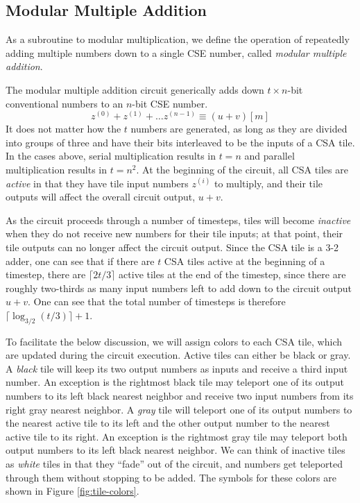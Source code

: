 \subsection{Modular Multiple Addition}
\label{subsec:mma}

As a subroutine to modular multiplication, we define the operation of
repeatedly adding multiple numbers down to a single CSE number, called
\emph{modular multiple addition}.

The modular multiple addition circuit generically adds down $t\times n$-bit
conventional numbers to an $n$-bit CSE number.
%
\begin{equation}
z^{(0)} + z^{(1)} + \ldots z^{(n-1)} \equiv (u+v)[m]
\end{equation}
%
It does not matter how the
$t$ numbers are generated, as long as they are divided into groups of three
and have their bits interleaved to be the inputs of a CSA tile.
In the cases above, serial multiplication results in
$t = n$ and parallel multiplication results in $t = n^2$.
At the beginning of the circuit, all CSA tiles are
\emph{active} in that they have tile input numbers $z^{(i)}$
to multiply, and their tile outputs will affect the overall circuit output,
$u+v$.

As the circuit proceeds through a number of timesteps,
tiles will become \emph{inactive} when they
do not receive new numbers for their tile inputs; at
that point, their tile outputs can no longer affect the circuit output.
Since the CSA tile is a 3-2 adder, one can see that if there are $t$ CSA tiles
active at the beginning of a timestep, there are $\lceil 2t/3 \rceil$ active
tiles at the end of the timestep, since there are roughly two-thirds as many
input numbers left to add down to the circuit output $u+v$. One can see that
the total number of timesteps
is therefore $\lceil \log_{3/2}(t/3) \rceil + 1$.

To facilitate the below discussion, we will assign colors to each CSA tile,
which are updated during the circuit execution. Active tiles can either be
black or gray.
A \emph{black} tile will keep its two output numbers as inputs and receive
a third input number. An exception is the rightmost black tile may teleport
one of its output numbers to its left black nearest neighbor and receive
two input numbers from its right gray nearest neighbor.
A \emph{gray} tile will teleport one of its output
numbers to the nearest active tile to its left and the other output number
to the nearest active tile to its right. An exception is the rightmost gray
tile may teleport both output numbers to its left black nearest neighbor.
We can think of inactive tiles as
\emph{white} tiles in that they ``fade'' out of the circuit, and numbers
get teleported through them without stopping to be added. The symbols for
these colors are shown in Figure \ref{fig:tile-colors}.

